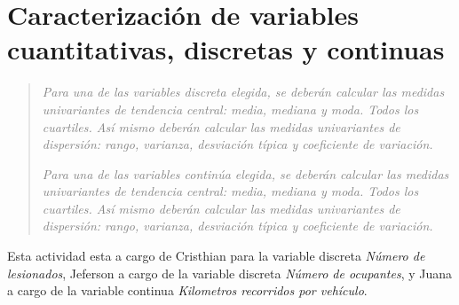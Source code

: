 \section*{Caracterización de variables cuantitativas, discretas y continuas}
\begin{quotation}
    \emph{\textcolor{gray}{Para una de las variables discreta elegida, se deberán calcular las medidas univariantes de tendencia central: media, mediana y moda. Todos los cuartiles. Así mismo deberán calcular las medidas univariantes de dispersión: rango, varianza, desviación típica y coeficiente de variación.}}\par
    \emph{\textcolor{gray}{Para una de las variables continúa elegida, se deberán calcular las medidas univariantes de tendencia central: media, mediana y moda. Todos los cuartiles. Así mismo deberán calcular las medidas univariantes de dispersión: rango, varianza, desviación típica y coeficiente de variación.}}
\end{quotation}
Esta actividad esta a cargo de Cristhian para la variable discreta \emph{Número de lesionados}, Jeferson a cargo de la variable discreta \emph{Número de ocupantes}, y Juana a cargo de la variable continua \emph{Kilometros recorridos por vehículo}.


